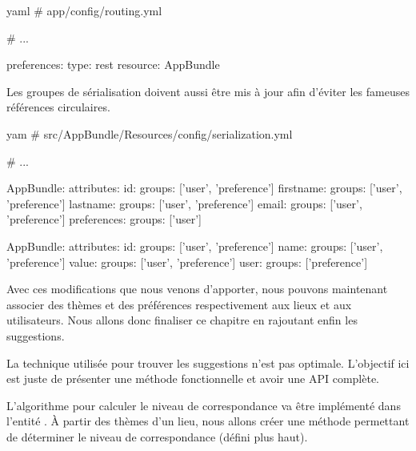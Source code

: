 \documentclass[big]{zmdocument}
\begin{document}
\begin{CodeBlock}{yaml}
# app/config/routing.yml

# ...

preferences:
    type:     rest
    resource: AppBundle\Controller\User\PreferenceController
\end{CodeBlock}



Les groupes de sérialisation doivent aussi être mis à jour afin d'éviter les fameuses références circulaires.



\begin{CodeBlock}{yam}
# src/AppBundle/Resources/config/serialization.yml

# ...

AppBundle\Entity\User:
    attributes:
        id:
            groups: ['user', 'preference']
        firstname:
            groups: ['user', 'preference']
        lastname:
            groups: ['user', 'preference']
        email:
            groups: ['user', 'preference']
        preferences:
            groups: ['user']

AppBundle\Entity\Preference:
    attributes:
        id:
            groups: ['user', 'preference']
        name:
            groups: ['user', 'preference']
        value:
            groups: ['user', 'preference']
        user:
            groups: ['preference']
\end{CodeBlock}



Avec ces modifications que nous venons d'apporter, nous pouvons maintenant associer des thèmes et des préférences respectivement aux lieux et aux utilisateurs.
Nous allons donc finaliser ce chapitre en rajoutant enfin les suggestions.







\begin{Information}
La technique utilisée pour trouver les suggestions n'est pas optimale. L'objectif ici est juste de présenter une méthode fonctionnelle et avoir une API complète.
\end{Information}


L'algorithme pour calculer le niveau de correspondance va être implémenté dans l'entité .
À partir des thèmes d'un lieu, nous allons créer une méthode permettant de déterminer le niveau de correspondance (défini plus haut).
\end{document}
